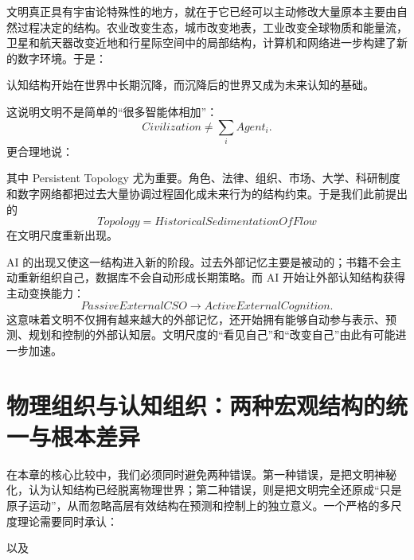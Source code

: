 文明真正具有宇宙论特殊性的地方，就在于它已经可以主动修改大量原本主要由自然过程决定的结构。农业改变生态，城市改变地表，工业改变全球物质和能量流，卫星和航天器改变近地和行星际空间中的局部结构，计算机和网络进一步构建了新的数字环境。于是：
\begin{statementbox}
\centering
{}
\end{statementbox}
认知结构开始在世界中长期沉降，而沉降后的世界又成为未来认知的基础。

这说明文明不是简单的“很多智能体相加”：
\[
Civilization
\neq
\sum_i Agent_i.
\]
更合理地说：
\begin{statementbox}
\centering
{}
\end{statementbox}
其中 Persistent Topology 尤为重要。角色、法律、组织、市场、大学、科研制度和数字网络都把过去大量协调过程固化成未来行为的结构约束。于是我们此前提出的
\[
Topology
=
HistoricalSedimentationOfFlow
\]
在文明尺度重新出现。

AI 的出现又使这一结构进入新的阶段。过去外部记忆主要是被动的；书籍不会主动重新组织自己，数据库不会自动形成长期策略。而 AI 开始让外部认知结构获得主动变换能力：
\[
PassiveExternalCSO
\rightarrow
ActiveExternalCognition.
\]
这意味着文明不仅拥有越来越大的外部记忆，还开始拥有能够自动参与表示、预测、规划和控制的外部认知层。文明尺度的“看见自己”和“改变自己”由此有可能进一步加速。

\section{物理组织与认知组织：两种宏观结构的统一与根本差异}

在本章的核心比较中，我们必须同时避免两种错误。第一种错误，是把文明神秘化，认为认知结构已经脱离物理世界；第二种错误，则是把文明完全还原成“只是原子运动”，从而忽略高层有效结构在预测和控制上的独立意义。一个严格的多尺度理论需要同时承认：
\begin{statementbox}
\centering
{}
\end{statementbox}
以及
\begin{statementbox}
\centering
{}
\end{statementbox}

